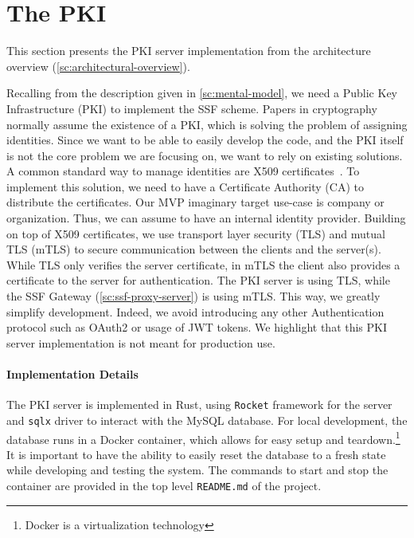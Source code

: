 \section{The PKI}\label{sc:PKI}

This section presents the PKI server implementation from the architecture overview (\cref{sc:architectural-overview}).

Recalling from the description given in \cref{sc:mental-model},
we need a Public Key Infrastructure (PKI) to implement the SSF scheme.
Papers in cryptography normally assume the existence of a PKI,
which is solving the problem of assigning identities.
Since we want to be able to easily develop the code, and the PKI itself
is not the core problem we are focusing on, we want to rely on existing
solutions.
A common standard way to manage identities are X509 certificates~\cite{rfc5280}.
To implement this solution, we need to have a Certificate Authority (CA)
to distribute the certificates.
Our MVP imaginary target use-case is company or organization. 
Thus, we can assume to have an internal identity provider.
Building on top of X509 certificates, we use transport
layer security (TLS) and mutual TLS (mTLS) to 
secure communication between the clients and the server(s).
While TLS only verifies the server certificate,
in mTLS the client also provides a certificate to the server
for authentication.
The PKI server is using TLS, while the SSF Gateway (\cref{sc:ssf-proxy-server}) is using mTLS.
This way, we greatly simplify development. Indeed, we 
avoid introducing any other Authentication
protocol such as OAuth2 or usage of JWT tokens.
We highlight that this PKI server implementation is not meant for production use.


\paragraph{Implementation Details} 
The PKI server is implemented in Rust, using \texttt{Rocket}
framework for the server and \texttt{sqlx} driver to interact
with the MySQL database. 
For local development, 
the database runs in a Docker container, which allows
for easy setup and teardown.\footnote{Docker is a virtualization technology} 
It is important to have the ability
to easily reset the database to a fresh state 
while developing and testing the system.
The commands to start and stop the container are provided
in the top level \texttt{README.md} of the project.

